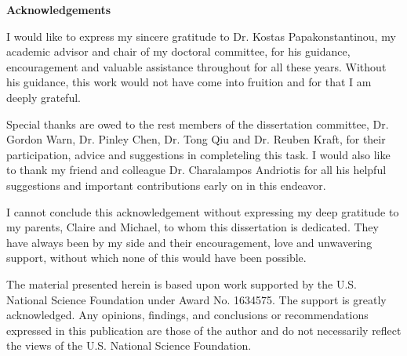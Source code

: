 \clearpage
{}
\begin{center}
\textbf{\Large Acknowledgements}\\
\vspace{\baselineskip}
\end{center}

I would like to express my sincere gratitude to Dr. Kostas Papakonstantinou, my 
academic advisor and chair of my doctoral committee, for his guidance, 
encouragement and valuable assistance throughout for all these years. Without 
his guidance, this work would not have come into fruition and for that I am 
deeply grateful.

Special thanks are owed to the rest members of the dissertation committee, Dr. 
Gordon Warn, Dr. Pinley Chen, Dr. Tong Qiu and Dr. Reuben Kraft, for their 
participation, advice and suggestions in completeling this task. I would also 
like to thank my friend and colleague Dr. Charalampos Andriotis for all his 
helpful suggestions and important contributions early on in this endeavor.

I cannot conclude this acknowledgement without expressing my deep gratitude to 
my parents, Claire and Michael, to whom this dissertation is dedicated. They  
have always been by my side and their encouragement, love and unwavering 
support, without which none of this would have been possible.

The material presented herein is based upon work supported by the U.S. National 
Science Foundation under Award No. 1634575. The support is greatly 
acknowledged. Any opinions, findings, and conclusions or recommendations 
expressed in this publication are those of the author and do not necessarily 
reflect the views of the U.S. National Science Foundation.
\clearpage
